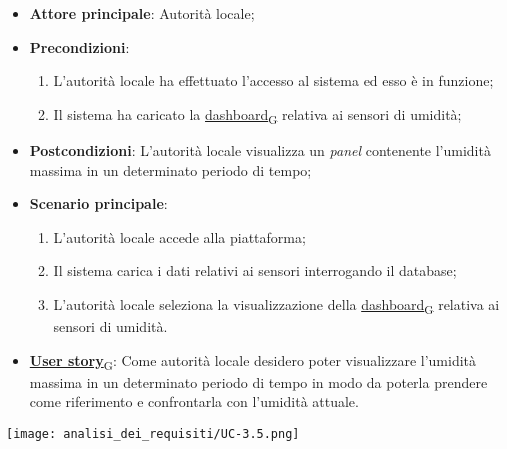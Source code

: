 \begin{itemize}
	\item \textbf{Attore principale}: Autorità locale;
	\item \textbf{Precondizioni}:
	      \begin{enumerate}
		      \item L'autorità locale ha effettuato l'accesso al sistema ed esso è in funzione;
		      \item Il sistema ha caricato la \href{https://7last.github.io/docs/rtb/documentazione-interna/glossario\#dashboard}{dashboard\textsubscript{G}} relativa ai sensori di umidità;
	      \end{enumerate}
	\item \textbf{Postcondizioni}: L'autorità locale visualizza un \textit{panel} contenente l'umidità massima in un determinato periodo di tempo;
	\item \textbf{Scenario principale}:
	      \begin{enumerate}
		      \item L'autorità locale accede alla piattaforma;
		      \item Il sistema carica i dati relativi ai sensori interrogando il database;
		      \item L'autorità locale seleziona la visualizzazione della \href{https://7last.github.io/docs/rtb/documentazione-interna/glossario\#dashboard}{dashboard\textsubscript{G}} relativa ai sensori di umidità.
	      \end{enumerate}
	\item \href{https://7last.github.io/docs/rtb/documentazione-interna/glossario\#user-story}{\textbf{User story}\textsubscript{G}}:
	      Come autorità locale desidero poter visualizzare l'umidità massima in un determinato periodo di tempo
	      in modo da poterla prendere come riferimento e confrontarla con l'umidità attuale.
\end{itemize}
\begin{center}
	\texttt{[image: analisi\_dei\_requisiti/UC-3.5.png]}
\end{center}

